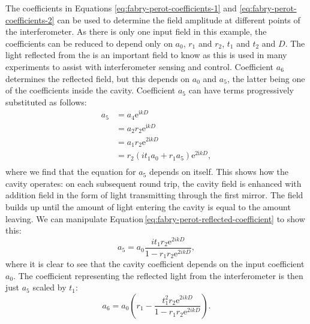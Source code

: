 The coefficients in Equations \ref{eq:fabry-perot-coefficients-1} and \ref{eq:fabry-perot-coefficients-2} can be used to determine the field amplitude at different points of the interferometer. As there is only one input field in this example, the coefficients can be reduced to depend only on $a_0$, $r_1$ and $r_2$, $t_1$ and $t_2$ and $D$. The light reflected from the \FP{} is an important field to know as this is used in many experiments to assist with interferometer sensing and control. Coefficient $a_6$ determines the reflected field, but this depends on $a_0$ and $a_5$, the latter being one of the coefficients inside the cavity. Coefficient $a_5$ can have terms progressively substituted as follows:
\begin{equation}
  \label{eq:fabry-perot-reflected-coefficient}
  \begin{split}
    a_5 &= a_4 \text{e}^{\text{i} kD} \\
        &= a_2 r_2 \text{e}^{\text{i} kD} \\
        &= a_1 r_2 \text{e}^{\text{2i} kD} \\
        &= r_2 \left( it_1 a_0 + r_1 a_5 \right) \text{e}^{\text{2i} kD}, \\
  \end{split}
\end{equation}
where we find that the equation for $a_5$ depends on itself. This shows how the cavity operates: on each subsequent round trip, the cavity field is enhanced with addition field in the form of light transmitting through the first mirror. The field builds up until the amount of light entering the cavity is equal to the amount leaving. We can manipulate Equation\,\ref{eq:fabry-perot-reflected-coefficient} to show this:
\begin{equation}
  a_5 = a_0 \frac{it_1 r_2 \text{e}^{2ikD}}{1 - r_1 r_2 \text{e}^{2ikD}},
\end{equation}
where it is clear to see that the cavity coefficient depends on the input coefficient $a_0$. The coefficient representing the reflected light from the interferometer is then just $a_5$ scaled by $t_1$:
\begin{equation}
  a_6 = a_0 \left( r_1 - \frac{t_1^2 r_2 \text{e}^{2ikD}}{1 - r_1 r_2 \text{e}^{2ikD}} \right).
\end{equation}

